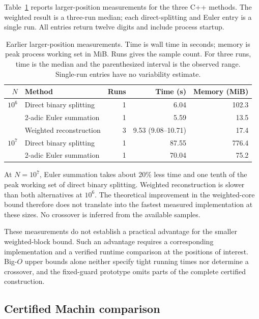 \documentclass[11pt]{article}
\numberwithin{equation}{section}
\theoremstyle{definition}
\begin{document}
Table~\ref{tab:large-positions} reports larger-position measurements
for the three C++ methods. The weighted result is a three-run
median; each direct-splitting and Euler entry is a single run.
All entries return twelve digits and include process startup.

\begin{table}[htbp]
\centering
\small
\caption{Earlier larger-position measurements. Time is wall time in seconds;
memory is peak process working set in MiB. Runs gives the sample count.
For three runs, time is the median and the parenthesized interval
is the observed range. Single-run entries have no variability estimate.}
\label{tab:large-positions}
\setlength{\tabcolsep}{5pt}
\begin{tabular}{rlrrr}
\toprule
$N$ & Method & Runs & Time (s) & Memory (MiB)\\
\midrule
$10^6$ & Direct binary splitting & 1 & 6.04 & 102.3\\
 & 2-adic Euler summation & 1 & 5.59 & 13.5\\
 & Weighted reconstruction & 3 & 9.53 (9.08--10.71) & 17.4\\
\addlinespace
$10^7$ & Direct binary splitting & 1 & 87.55 & 776.4\\
 & 2-adic Euler summation & 1 & 70.04 & 75.2\\
\bottomrule
\end{tabular}
\end{table}

At $N=10^7$, Euler summation takes about 20\% less time and
one tenth of the peak working set of direct binary splitting.
Weighted reconstruction is slower than both alternatives at $10^6$.
The theoretical improvement in the weighted-core bound therefore
does not translate into the fastest measured implementation at
these sizes. No crossover is inferred from the available samples.

These measurements do not establish a practical advantage for the
smaller weighted-block bound. Such an advantage requires a corresponding
implementation and a verified runtime comparison at the positions of
interest. Big-$O$ upper bounds alone neither specify tight running times
nor determine a crossover, and the fixed-guard prototype omits parts of
the complete certified construction.

\subsection{Certified Machin comparison}\label{sec:machin-comparison}
\end{document}
